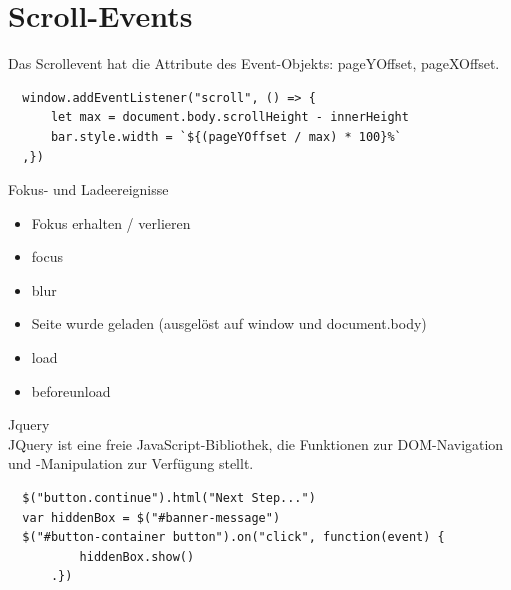   \section*{Scroll-Events}
  Das Scrollevent hat die Attribute des Event-Objekts: pageYOffset, pageXOffset.
  
  \begin{verbatim}
  window.addEventListener("scroll", () => {
      let max = document.body.scrollHeight - innerHeight
      bar.style.width = `${(pageYOffset / max) * 100}%`
  ,})
  \end{verbatim}
  
  Fokus- und Ladeereignisse
  
  \begin{itemize}
    \item Fokus erhalten / verlieren
    \item focus
    \item blur
    \item Seite wurde geladen (ausgelöst auf window und document.body)
    \item load
    \item beforeunload
  \end{itemize}
  
  Jquery\\
  JQuery ist eine freie JavaScript-Bibliothek, die Funktionen zur DOM-Navigation und -Manipulation zur Verfügung stellt.
  
  \begin{verbatim}
  $("button.continue").html("Next Step...")
  var hiddenBox = $("#banner-message")
  $("#button-container button").on("click", function(event) {
          hiddenBox.show()
      .})
  \end{verbatim}
  
